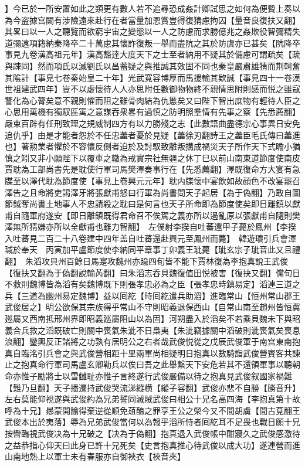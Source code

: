 】今已於一所安置如此之類更有數人若不追尋恐成姦計卿試思之如何為便䞇上奏以為今盗據宫闕有涉險遠來赴行在者當量加恩賞豈得復猜慮拘囚【量音良復扶又翻】其畧曰以一人之聽覽而欲窮宇宙之變態以一人之防慮而求勝億兆之姦欺役智彌精失道彌遠項籍納秦降卒二十萬慮其懷詐復叛一舉而盡阬之其於防虞亦已甚矣【阬降卒事見九卷漢高祖元年】漢高豁逹大度天下之士至者納用不疑其於備慮可謂疏矣【疏與踈同】然而項氏以滅劉氏以昌蓄疑之與推誠其效固不同也秦皇嚴肅雄猜而荆軻奮其隂計【事見七卷秦始皇二十年】光武寛容博厚而馬援輸其欵誠【事見四十一卷漢世祖建武四年】豈不以虚懷待人人亦思附任數御物物終不親情思附則感而悦之雖寇讐化為心膂矣意不親則懼而阻之雖骨肉結為仇慝矣又曰陛下智出庶物有輕待人臣之心思用萬機有獨馭區㝢之意謀吞衆畧有過慎之防明照羣情有先事之察【先悉薦翻】嚴束百辟有任刑致理之規威制四方有以力勝殘之志【此數語曲盡德宗心事異日安免追仇乎】由是才能者怨於不任忠藎者憂於見疑【藎徐刃翻詩王之藎臣毛氏傳曰藎進也】著勲業者懼於不容懷反側者迫於及討馭致離叛搆成禍災天子所作天下式瞻小猶慎之矧又非小願陛下以覆車之轍為戒實宗社無疆之休丁巳以前山南東道節度使南皮賈耽為工部尚書先是耽使行軍司馬樊澤奏事行在【先悉薦翻】澤既復命方大宴有急牒至以澤代耽為節度使【事見上卷興元元年】耽内牒懷中宴飲如故顔色不改宴罷召澤告之且命將吏謁澤牙將張獻甫怒曰行軍為尚書問天子起居【為于偽翻】乃敢自圖節鉞奪尚書土地事人不忠請殺之耽曰是何言也天子所命即為節度使矣即日離鎮以獻甫自隨軍府遂安【即日離鎮既得君命召不俟駕之義亦所以遏亂原以張獻甫自隨則樊澤無所猜嫌亦所以全獻甫也離力智翻】　左僕射李揆自吐蕃還甲子薨於鳳州【李揆入吐蕃見二百二十八卷建中四年盖自吐蕃還赴興元至鳳州而薨】　韓遊瓌引兵會渾瑊於奉天　丙寅加平盧節度使李納同平章事丁卯義王玼薨【玼玄宗子玼音此又且禮翻】　朱滔攻貝州百餘日馬寔攻魏州亦踰四旬皆不能下賈林復為李抱真說王武俊【復扶又翻為于偽翻說輸芮翻】曰朱滔志呑貝魏復值田悦被害【復抉又翻】儻旬日不救則魏博皆為滔有矣魏博既下則張孝忠必為之臣【張孝忠時鎮易定】滔連三道之兵【三道為幽州易定魏博】益以囘紇【時囘紇遣兵助滔】進臨常山【恒州常山郡王武俊居之】明公欲保其宗族得乎常山不守則昭義退保西山【自常山南至趙州皆恒冀廵屬又西南抵邢州界即昭義廵屬阻山以為固】河朔盡入於滔矣不若乘貝魏未下與昭義合兵救之滔既破亡則關中喪氣朱泚不日梟夷【朱泚竊據關中滔破則泚喪氣矣喪息浪翻】鑾輿反正諸將之功孰有居明公之右者哉武俊悦從之戊辰武俊軍于南宫東南抱真自臨洺引兵會之與武俊營相距十里兩軍尚相疑明日抱真以數騎詣武俊營賓客共諫止之抱真命行軍司馬盧玄卿勒兵以俟曰吾之此舉繫天下安危若其不還領軍事以聽朝命亦惟子勵將士以雪讎耻亦惟子言終遂行武俊嚴備以待之抱真見武俊叙國家禍難【難乃旦翻】天子播遷持武俊哭流涕縱横【縱子容翻】武俊亦悲不自勝【勝音升】左右莫能仰視遂與武俊約為兄弟誓同滅賊武俊曰相公十兄名高四海【李抱真第十故呼為十兄】曏蒙開諭得棄逆從順免葅醢之罪享王公之榮今又不間胡虜【間古莧翻王武俊本出於夷落】辱為兄弟武俊當何以為報乎滔所恃者囘紇耳不足畏也戰日願十兄按轡臨視武俊决為十兄破之【决為于偽翻】抱真退入武俊帳中酣寢久之武俊感激待之益恭指心仰天曰此身已許十兄死矣【史言抱真推心待武俊以成大功】遂連營而進　山南地熱上以軍士未有春服亦自御裌衣【裌音夾】

